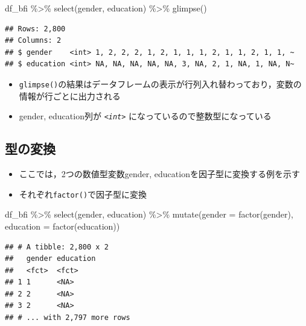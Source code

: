 \documentclass[
  xelatex,ja=standard, b5paper]{bxjsbook}
\newenvironment{Shaded}{\begin{snugshade}}{\end{snugshade}}
\newcommand{\AttributeTok}[1]{\textcolor[rgb]{0.77,0.63,0.00}{#1}}
\newcommand{\FunctionTok}[1]{\textcolor[rgb]{0.00,0.00,0.00}{#1}}
\newcommand{\NormalTok}[1]{#1}
\newcommand{\SpecialCharTok}[1]{\textcolor[rgb]{0.00,0.00,0.00}{#1}}
\providecommand{\tightlist}{%
  \setlength{\itemsep}{0pt}\setlength{\parskip}{0pt}}
\begin{document}
\begin{Shaded}
\begin{Highlighting}[]
\NormalTok{df\_bfi }\SpecialCharTok{\%\textgreater{}\%}
  \FunctionTok{select}\NormalTok{(gender, education) }\SpecialCharTok{\%\textgreater{}\%}
  \FunctionTok{glimpse}\NormalTok{()}
\end{Highlighting}
\end{Shaded}

\begin{verbatim}
## Rows: 2,800
## Columns: 2
## $ gender    <int> 1, 2, 2, 2, 1, 2, 1, 1, 1, 2, 1, 1, 2, 1, 1, ~
## $ education <int> NA, NA, NA, NA, NA, 3, NA, 2, 1, NA, 1, NA, N~
\end{verbatim}

\begin{itemize}
\tightlist
\item
  \texttt{glimpse()}の結果はデータフレームの表示が行列入れ替わっており，変数の情報が行ごとに出力される
\item
  gender, education列が \emph{\texttt{\textless{}int\textgreater{}}} になっているので整数型になっている
\end{itemize}

\hypertarget{mu-kata-trans}{%
\subsection{型の変換}\label{mu-kata-trans}}

\begin{itemize}
\tightlist
\item
  ここでは，2つの数値型変数gender, educationを因子型に変換する例を示す
\item
  それぞれ\texttt{factor()}で因子型に変換
\end{itemize}

\begin{Shaded}
\begin{Highlighting}[]
\NormalTok{df\_bfi }\SpecialCharTok{\%\textgreater{}\%}
  \FunctionTok{select}\NormalTok{(gender, education) }\SpecialCharTok{\%\textgreater{}\%} 
  \FunctionTok{mutate}\NormalTok{(}\AttributeTok{gender =} \FunctionTok{factor}\NormalTok{(gender),}
         \AttributeTok{education =} \FunctionTok{factor}\NormalTok{(education))}
\end{Highlighting}
\end{Shaded}

\begin{verbatim}
## # A tibble: 2,800 x 2
##   gender education
##   <fct>  <fct>    
## 1 1      <NA>     
## 2 2      <NA>     
## 3 2      <NA>     
## # ... with 2,797 more rows
\end{verbatim}
\end{document}
